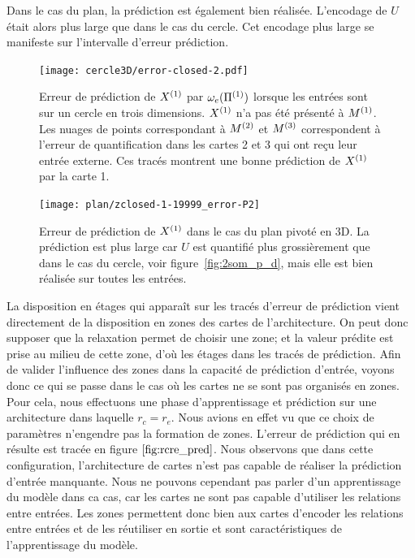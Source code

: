 \documentclass[../main]{subfiles}
\begin{document}
Dans le cas du plan, la prédiction est également bien réalisée. L'encodage de $U$ était alors plus large que dans le cas du cercle. Cet encodage plus large se manifeste sur l'intervalle d'erreur prédiction.

\begin{figure}
	\texttt{[image: cercle3D/error-closed-2.pdf]}
	\caption{Erreur de prédiction de $X^{({1})}$ par $\omega_e(\Pi^{({1})})$ lorsque les entrées sont sur un cercle en trois dimensions. $X^{({1})}$ n'a pas été présenté à $M^{({1})}$.
	 Les nuages de points correspondant à $M^{({2})}$ et $M^{({3})}$ correspondent à l'erreur de quantification dans les cartes 2 et 3 qui ont reçu leur entrée externe. Ces tracés montrent une bonne prédiction de $X^{({1})}$ par la carte 1. \label{fig:pred_cercle}}
\end{figure}

\begin{figure}
	\texttt{[image: plan/zclosed-1-19999\_error-P2]}	
	\caption{Erreur de prédiction de $X^{({1})}$ dans le cas du plan pivoté en 3D. La prédiction est plus large car $U$ est quantifié plus grossièrement que dans le cas du cercle, voir figure~\ref{fig:2som_p_d}, mais elle est bien réalisée sur toutes les entrées. \label{fig:plan3_pred}}
\end{figure}

La disposition en étages qui apparaît sur les tracés d'erreur de prédiction vient directement de la disposition en zones des cartes de l'architecture. On peut donc supposer que la relaxation permet de choisir une zone; et la valeur prédite est prise au milieu de cette zone, d'où les \og étages \fg{} dans les tracés de prédiction.
Afin de valider l'influence des zones dans la capacité de prédiction d'entrée, voyons donc ce qui se passe dans le cas où les cartes ne se sont pas organisés en zones.
Pour cela, nous effectuons une phase d'apprentissage et prédiction sur une architecture dans laquelle $r_c = r_e$. 
Nous avions en effet vu que ce choix de paramètres n'engendre pas la formation de zones. L'erreur de prédiction qui en résulte est tracée en figure $\ref{fig:rcre_pred}$.
Nous observons que dans cette configuration, l'architecture de cartes n'est pas capable de réaliser la prédiction d'entrée manquante.
Nous ne pouvons cependant pas parler d'un apprentissage du modèle dans ca cas, car les cartes ne sont pas capable d'utiliser les relations entre entrées.
Les zones permettent donc bien aux cartes d'encoder les relations entre entrées et de les réutiliser en sortie et sont caractéristiques de l'apprentissage du modèle.
\end{document}
